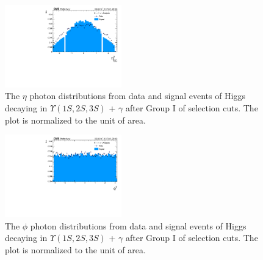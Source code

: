 \begin{figure}[!htbp]
\begin{center}
\includegraphics[width=0.45\textwidth]{figures/outputPlots/HtoUpsilon_Cat0_ZZZZZ/au/data_x_mc/noKinCuts/h_noKin_Photon_eta}\hspace*{1.cm}
\end{center}\vspace*{-.5cm}
\caption{The $\eta$ photon distributions from data and signal events of Higgs decaying in $\Upsilon(1S,2S,3S)$ + $\gamma$ after Group I of selection cuts. The plot is normalized to the unit of area.}
\label{fig:etaPhoton_HtoUpsilon_Cat0}
\end{figure}

\begin{figure}[!htbp]
\begin{center}
\includegraphics[width=0.45\textwidth]{figures/outputPlots/HtoUpsilon_Cat0_ZZZZZ/au/data_x_mc/noKinCuts/h_noKin_Photon_phi}\hspace*{1.cm}
\end{center}\vspace*{-.5cm}
\caption{The $\phi$ photon distributions from data and signal events of Higgs decaying in $\Upsilon(1S,2S,3S)$ + $\gamma$ after Group I of selection cuts. The plot is normalized to the unit of area.}
\label{fig:phiPhoton_HtoUpsilon_Cat0}
\end{figure}

